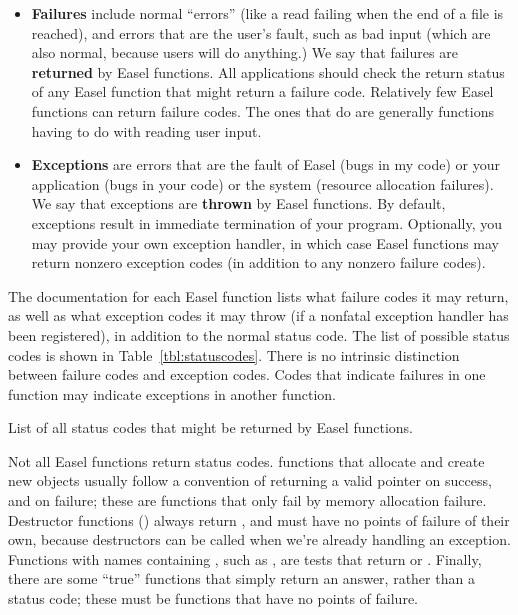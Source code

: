 \begin{itemize}
\item \textbf{Failures} include normal ``errors'' (like a read failing
  when the end of a file is reached), and errors that are the user's
  fault, such as bad input (which are also normal, because users will
  do anything.) We say that failures are \textbf{returned} by Easel
  functions. All applications should check the return status of any
  Easel function that might return a failure code. Relatively few
  Easel functions can return failure codes. The ones that do are
  generally functions having to do with reading user input.

\item \textbf{Exceptions} are errors that are the fault of Easel (bugs
in my code) or your application (bugs in your code) or the system
(resource allocation failures). We say that exceptions are
\textbf{thrown} by Easel functions. By default, exceptions result in
immediate termination of your program. Optionally, you may provide
your own exception handler, in which case Easel functions may return
nonzero exception codes (in addition to any nonzero failure codes).
\end{itemize}

The documentation for each Easel function lists what failure codes it
may return, as well as what exception codes it may throw (if a
nonfatal exception handler has been registered), in addition to the
 normal status code. The list of possible status codes is
shown in Table~\ref{tbl:statuscodes}. There is no intrinsic
distinction between failure codes and exception codes. Codes that
indicate failures in one function may indicate exceptions in another
function.

\begin{table}
\begin{center}

\end{center}
\caption{List of all status codes that might be returned by Easel functions.}
\label{tbl:statuscodes}
\end{table}

Not all Easel functions return status codes. 
functions that allocate and create new objects usually follow a
convention of returning a valid pointer on success, and 
on failure; these are functions that only fail by memory allocation
failure. Destructor functions () always return
, and must have no points of failure of their own, because
destructors can be called when we're already handling an
exception. Functions with names containing , such as
, are tests that return  or
. Finally, there are some ``true'' functions that simply
return an answer, rather than a status code; these must be functions
that have no points of failure.


